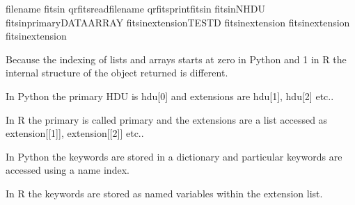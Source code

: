\documentclass[letterpaper,10pt,english]{sphinxmanual}
\begin{document}
%
\begin{sphinxVerbatim}[commandchars=\\\{\}]
filename
fitsin qr\PYGZus{}fitsreadfilename
qr\PYGZus{}fitsprintfitsin
fitsinNHDU
fitsinprimaryDATA\PYGZus{}ARRAY
fitsinextension\PYG{p}{[[}\PYG{p}{]]}TESTD
fitsinextension\PYG{p}{[[}\PYG{p}{]]}
fitsinextension\PYG{p}{[[}\PYG{p}{]]}
fitsinextension\PYG{p}{[[}\PYG{p}{]]}\PYG{p}{[}\PYG{p}{]}
\end{sphinxVerbatim}

Because the indexing of lists and arrays starts at zero in Python and 1 in R
the internal structure of the object returned is different.

In Python the primary HDU is hdu{[}0{]} and extensions are hdu{[}1{]}, hdu{[}2{]} etc..

In R the primary is called primary and the extensions are a list
accessed as extension{[}{[}1{]}{]}, extension{[}{[}2{]}{]} etc..

In Python the keywords are stored in a dictionary and
particular keywords are accessed using a name index.

In R the
keywords are stored as named variables within the extension list.
\end{document}
